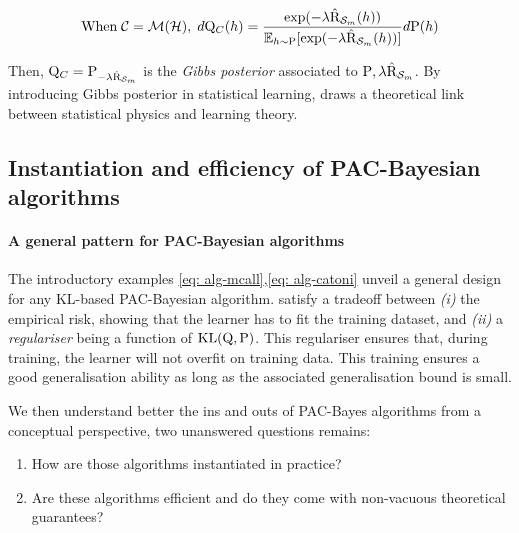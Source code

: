 \begin{align}
  \label{eq: catoni-gibbs}
  \text{When}\; \mathcal{C}= \mathcal{M}(\mathcal{H}),\; d\mathrm{Q}_{C}(h) = \frac{\exp(-\lambda \hat{\text{R}}_{\mathcal{S}_m}(h))}{\mathbb{E}_{h\sim\mathrm{P}}[\exp(-\lambda \hat{\text{R}}_{\mathcal{S}_m}(h))]} d\mathrm{P}(h)
\end{align}

Then, $\mathrm{Q}_{C} = \mathrm{P}_{-\lambda \hat{\text{R}}_{\mathcal{S}_m}}$ is the \emph{Gibbs posterior} associated to $\mathrm{P},\lambda\hat{\text{R}}_{\mathcal{S}_m}$. By introducing Gibbs posterior in statistical learning, \citet{catoni2007pac} draws a theoretical link between statistical physics and learning theory.

\subsection*{Instantiation and efficiency of PAC-Bayesian algorithms}

\paragraph{A general pattern for PAC-Bayesian algorithms}

The introductory examples \eqref{eq: alg-mcall},\eqref{eq: alg-catoni} unveil a general design for any KL-based PAC-Bayesian algorithm. satisfy a tradeoff between \textit{(i)} the empirical risk, showing that the learner has to fit the training dataset, and \textit{(ii)} a \emph{regulariser} being a function of $\mathrm{KL}(\mathrm{Q},\mathrm{P})$. This regulariser ensures that, during training, the learner will not overfit on training data. This training ensures a good generalisation ability as long as the associated generalisation bound is small. 

We then understand better the ins and outs of PAC-Bayes algorithms from a conceptual perspective, two unanswered questions remains: 

\begin{enumerate}
  \item How are those algorithms instantiated in practice?
  \item Are these algorithms efficient and do they come with non-vacuous theoretical guarantees? 
\end{enumerate}



